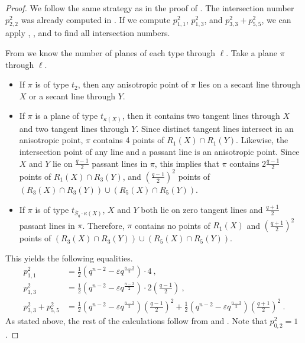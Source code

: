 \documentclass[a4paper]{article}
\theoremstyle{definition}
\newcommand{\eps}{\varepsilon}
\newcommand{\ns}{\overline S}
\begin{document}
\begin{proof}
 We follow the same strategy as in the proof of .
 The intersection number $p^2_{2,2}$ was already computed in .
 If we compute $p^2_{1,1}$, $p^2_{1,3}$, and $p^2_{3,3} + p^2_{5,5}$, we can apply , , and  to find all intersection numbers.
 
 From  we know the number of planes of each type through $\ell$.
 Take a plane $\pi$ through $\ell$.
 \begin{itemize}
  \item If $\pi$ is of type $t_2$, then any anisotropic point of $\pi$ lies on a secant line through $X$ or a secant line through $Y$.
  \item If $\pi$ is a plane of type $t_{\kappa(X)}$, then it contains two tangent lines through $X$ and two tangent lines through $Y$.
  Since distinct tangent lines intersect in an anisotropic point, $\pi$ contains 4 points of $R_1(X) \cap R_1(Y)$.
  Likewise, the intersection point of any line and a passant line is an anisotropic point.
  Since $X$ and $Y$ lie on $\frac{q-1}2$ passant lines in $\pi$, this implies that $\pi$ contains $2 \frac{q-1}2$ points of $R_1(X) \cap R_3(Y)$, and $\left( \frac{q-1}2\right)^2$ points of $(R_3(X) \cap R_3(Y)) \cup (R_5(X) \cap R_5(Y))$.
  \item If $\pi$ is of type $t_{\ns_q \cdot \kappa(X)}$, $X$ and $Y$ both lie on zero tangent lines and $\frac{q+1}2$ passant lines in $\pi$.
  Therefore, $\pi$ contains no points of $R_1(X)$ and $\left( \frac{q+1}2 \right )^2$ points of $(R_3(X) \cap R_3(Y)) \cup (R_5(X) \cap R_5(Y))$.
 \end{itemize}
 This yields the following equalities.
 \begin{align*}
  p^2_{1,1} &=\frac{1}{2}\left(q^{n-2}-\eps q^{\frac{n-3}{2}}\right)\cdot4\:,\\
  p^2_{1,3}&=\frac{1}{2}\left( q^{n-2}-\eps q^{\frac{n-3}{2}} \right ) \cdot 2 \left( \frac{q-1}{2} \right )\:,\\
  p^2_{3,3}+p^2_{5,5}&=\frac{1}{2}\left(q^{n-2}-\eps q^{\frac{n-3}{2}}\right)\left(\frac{q-1}{2}\right)^{2}+\frac{1}{2}\left(q^{n-2}-\eps q^{\frac{n-3}{2}}\right)\left(\frac{q+1}{2}\right)^{2}\:.
 \end{align*}
 As stated above, the rest of the calculations follow from   and .
 Note that $p^{2}_{0,2}=1$.
\end{proof}
\end{document}
